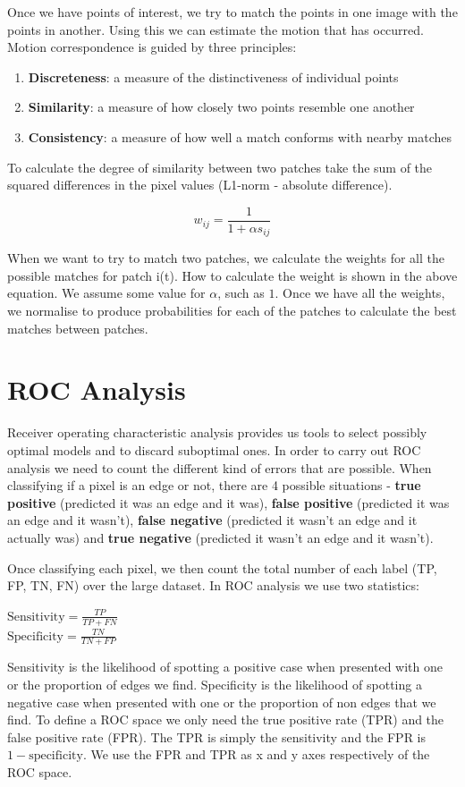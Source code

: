 \documentclass{article}
\begin{document}
	\par 
	Once we have points of interest, we try to match the points in one image with the points in another. Using this we can estimate the motion that has occurred. Motion correspondence is guided by three principles:
	\begin{enumerate}
		\item \textbf{Discreteness}: a measure of the distinctiveness of individual points
		\item \textbf{Similarity}: a measure of how closely two points resemble one another
		\item \textbf{Consistency}: a measure of how well a match conforms with nearby matches
	\end{enumerate}
	
	To calculate the degree of similarity between two patches take the sum of the squared differences in the pixel values (L1-norm - absolute difference).
	
	\[ w_{ij} = \frac{1}{1 + \alpha s_{ij}} \]
	
	When we want to try to match two patches, we calculate the weights for all the possible matches for patch i(t). How to calculate the weight is shown in the above equation. We assume some value for $\alpha$, such as $1$. Once we have all the weights, we normalise to produce probabilities for each of the patches to calculate the best matches between patches.
	

	\section{ROC Analysis}
	Receiver operating characteristic analysis provides us tools to select possibly optimal models and to discard suboptimal ones. In order to carry out ROC analysis we need to count the different kind of errors that are possible. When classifying if a pixel is an edge or not, there are 4 possible situations - \textbf{true positive} (predicted it was an edge and it was), \textbf{false positive} (predicted it was an edge and it wasn't), \textbf{false negative} (predicted it wasn't an edge and it actually was) and \textbf{true negative} (predicted it wasn't an edge and it wasn't).
	
Once classifying each pixel, we then count the total number of each label (TP, FP, TN, FN) over the large dataset. In ROC analysis we use two statistics:
	\begin{multicols}{2}
		\noindent
		\centering
			$ \text{Sensitivity} = \frac{TP}{TP+FN}$ \\
			$ \text{Specificity} = \frac{TN}{TN+FP}$
	\end{multicols}	
	Sensitivity is the likelihood of spotting a positive case when presented with one or the proportion of edges we find. Specificity is the likelihood of spotting a negative case when presented with one or the proportion of non edges that we find. To define a ROC space we only need the true positive rate (TPR) and the false positive rate (FPR). The TPR is simply the sensitivity and the FPR is $1 - \text{specificity}$. We use the FPR and TPR as x and y axes respectively of the ROC space.
	
\end{document}
